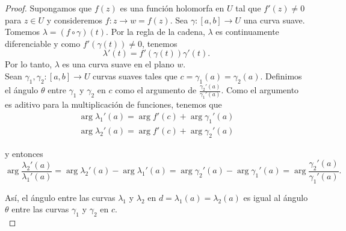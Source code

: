 \begin{proof}
    Supongamos que $f(z)$ es una función holomorfa en $U$ tal que $f'(z) \not = 0$ para $z \in U$ y consideremos $f:z \to w=f(z)$. Sea $\gamma: [a,b] \to U$ una curva suave. Tomemos $\lambda = (f \circ  \gamma)(t)$. Por la regla de la cadena, $\lambda$ es continuamente diferenciable y como $f'(\gamma(t)) \not = 0$, tenemos
    \begin{equation}
        \label{eq:cadena}
        \lambda'(t) = f'(\gamma(t))\gamma'(t).
    \end{equation}
    Por lo tanto, $\lambda$ es una curva suave en el plano $w$. \\

    Sean $\gamma_1, \gamma_2: [a,b] \to U$ curvas suaves tales que $c=\gamma_1(a) = \gamma_2(a)$. Definimos el ángulo $\theta$ entre $\gamma_1$ y $\gamma_2$ en $c$ como el argumento de $\frac{\gamma_2'(a)}{\gamma_1'(a)}$. Como el argumento es aditivo para la multiplicación de funciones, tenemos que
    \begin{equation*}
    \begin{split}
        \arg \lambda_1'(a) = \arg f'(c) + \arg \gamma_1'(a)\\
        \arg \lambda_2'(a) = \arg f'(c) + \arg \gamma_2'(a)
    \end{split}
    \end{equation*}

    y entonces
    \begin{equation*}
        \arg  \frac{\lambda_2'(a)}{\lambda_1'(a)} = \arg \lambda_2'(a) - \arg \lambda_1'(a) = \arg \gamma_2'(a) - \arg \gamma_1'(a) = \arg  \frac{\gamma_2'(a)}{\gamma_1'(a)}.
    \end{equation*}

    Así, el ángulo entre las curvas $\lambda_1$ y $\lambda_2$ en $d = \lambda_1(a) = \lambda_2(a)$ es igual al ángulo $\theta$ entre las curvas $\gamma_1$ y $\gamma_2$ en $c$. \\
\end{proof}


